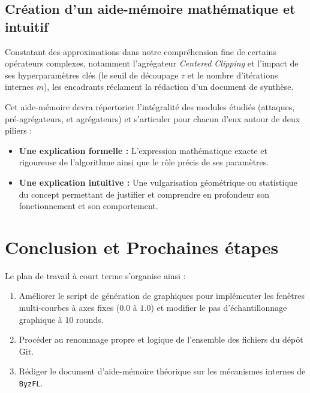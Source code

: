 \documentclass[11pt, a4paper]{article}
\begin{document}
\subsection{Création d'un aide-mémoire mathématique et intuitif}
Constatant des approximations dans notre compréhension fine de certains opérateurs complexes, notamment l'agrégateur \textit{Centered Clipping} et l'impact de ses hyperparamètres clés (le seuil de découpage $\tau$ et le nombre d'itérations internes $m$), les encadrants réclament la rédaction d'un document de synthèse.

Cet aide-mémoire devra répertorier l'intégralité des modules étudiés (attaques, pré-agrégateurs, et agrégateurs) et s'articuler pour chacun d'eux autour de deux piliers :
\begin{itemize}
    \item \textbf{Une explication formelle :} L'expression mathématique exacte et rigoureuse de l'algorithme ainsi que le rôle précis de ses paramètres.
    \item \textbf{Une explication intuitive :} Une vulgarisation géométrique ou statistique du concept permettant de justifier et comprendre en profondeur son fonctionnement et son comportement.
\end{itemize}

\section{Conclusion et Prochaines étapes}
Le plan de travail à court terme s'organise ainsi :
\begin{enumerate}
    \item Améliorer le script de génération de graphiques pour implémenter les fenêtres multi-courbes à axes fixes ($0.0$ à $1.0$) et modifier le pas d'échantillonnage graphique à 10 rounds.
    \item Procéder au renommage propre et logique de l'ensemble des fichiers du dépôt Git.
    \item Rédiger le document d'aide-mémoire théorique sur les mécanismes internes de \texttt{ByzFL}.
\end{enumerate}
\end{document}
